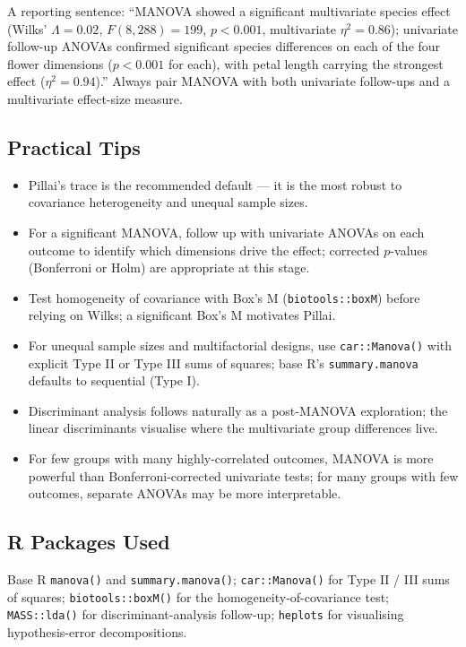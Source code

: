 \documentclass[
]{article}
\providecommand{\tightlist}{%
  \setlength{\itemsep}{0pt}\setlength{\parskip}{0pt}}
\begin{document}
A reporting sentence: ``MANOVA showed a significant multivariate species
effect (Wilks' \(\Lambda = 0.02\), \(F(8, 288) = 199\), \(p < 0.001\),
multivariate \(\eta^2 = 0.86\)); univariate follow-up ANOVAs confirmed
significant species differences on each of the four flower dimensions
(\(p < 0.001\) for each), with petal length carrying the strongest
effect (\(\eta^2 = 0.94\)).'' Always pair MANOVA with both univariate
follow-ups and a multivariate effect-size measure.

\subsection{Practical Tips}\label{practical-tips}

\begin{itemize}
\tightlist
\item
  Pillai's trace is the recommended default --- it is the most robust to
  covariance heterogeneity and unequal sample sizes.
\item
  For a significant MANOVA, follow up with univariate ANOVAs on each
  outcome to identify which dimensions drive the effect; corrected
  \(p\)-values (Bonferroni or Holm) are appropriate at this stage.
\item
  Test homogeneity of covariance with Box's M (\texttt{biotools::boxM})
  before relying on Wilks; a significant Box's M motivates Pillai.
\item
  For unequal sample sizes and multifactorial designs, use
  \texttt{car::Manova()} with explicit Type II or Type III sums of
  squares; base R's \texttt{summary.manova} defaults to sequential (Type
  I).
\item
  Discriminant analysis follows naturally as a post-MANOVA exploration;
  the linear discriminants visualise where the multivariate group
  differences live.
\item
  For few groups with many highly-correlated outcomes, MANOVA is more
  powerful than Bonferroni-corrected univariate tests; for many groups
  with few outcomes, separate ANOVAs may be more interpretable.
\end{itemize}

\subsection{R Packages Used}\label{r-packages-used}

Base R \texttt{manova()} and \texttt{summary.manova()};
\texttt{car::Manova()} for Type II / III sums of squares;
\texttt{biotools::boxM()} for the homogeneity-of-covariance test;
\texttt{MASS::lda()} for discriminant-analysis follow-up;
\texttt{heplots} for visualising hypothesis-error decompositions.
\end{document}
